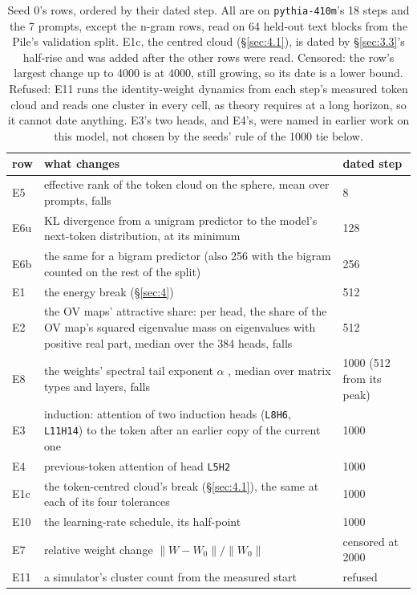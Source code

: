 \documentclass[11pt]{article}
\begin{document}
\begin{table}[tbp]
\centering\small
\caption{Seed 0's rows, ordered by their dated step. All are on \texttt{pythia-410m}'s 18 steps and the 7 prompts, except the n-gram rows, read on 64 held-out text blocks from the Pile's validation split. E1c, the centred cloud (\S\ref{sec:4.1}), is dated by \S\ref{sec:3.3}'s half-rise and was added after the other rows were read. Censored: the row's largest change up to 4000 is at 4000, still growing, so its date is a lower bound. Refused: E11 runs the identity-weight dynamics from each step's measured token cloud and reads one cluster in every cell, as theory requires at a long horizon, so it cannot date anything. E3's two heads, and E4's, were named in earlier work on this model, not chosen by the seeds' rule of the 1000 tie below.}\label{tab:rows}
\begin{tabularx}{\linewidth}{@{}l X l@{}}
\toprule
row & what changes & dated step \\
\midrule
E5 & effective rank of the token cloud on the sphere, mean over prompts, falls & 8 \\
E6u & KL divergence from a unigram predictor to the model's next-token distribution, at its minimum & 128 \\
E6b & the same for a bigram predictor (also 256 with the bigram counted on the rest of the split) & 256 \\
E1 & the energy break (\S\ref{sec:4}) & 512 \\
E2 & the OV maps' attractive share: per head, the share of the OV map's squared eigenvalue mass on eigenvalues with positive real part, median over the 384 heads, falls & 512 \\
E8 & the weights' spectral tail exponent $\alpha $ \citep{martin2019}, median over matrix types and layers, falls & 1000 (512 from its peak) \\
E3 & induction: attention of two induction heads (\texttt{L8H6}, \texttt{L11H14}) to the token after an earlier copy of the current one & 1000 \\
E4 & previous-token attention of head \texttt{L5H2} & 1000 \\
E1c & the token-centred cloud's break (\S\ref{sec:4.1}), the same at each of its four tolerances & 1000 \\
E10 & the learning-rate schedule, its half-point & 1000 \\
E7 & relative weight change $\|W - W_{0}\| / \|W_{0}\|$ & censored at 2000 \\
E11 & a simulator's cluster count from the measured start & refused \\
\bottomrule
\end{tabularx}
\end{table}
\end{document}
